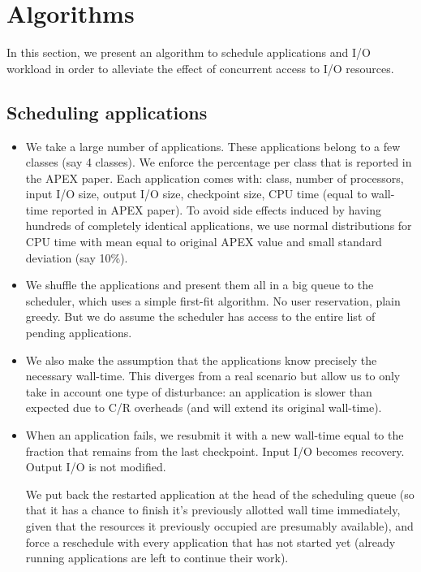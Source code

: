 \section{Algorithms}\label{sec:algorithms}

In this section, we present an algorithm to schedule applications and
I/O workload in order to alleviate the effect of concurrent access
to I/O resources.

\subsection{Scheduling applications}

\begin{itemize}
\item We take a large number of applications. These applications belong to a few
  classes (say 4 classes). We enforce the percentage per class that is reported in
  the APEX paper.  Each application comes with: class, number of processors, input
  I/O size, output I/O size, checkpoint size, CPU time (equal to wall-time reported
  in APEX paper). To avoid side effects induced by having hundreds of completely
  identical applications, we use normal distributions for CPU time with mean equal to
  original APEX value and small standard deviation (say 10\%). 
  \item We shuffle the applications and present them all in a big queue to the scheduler,
  which uses a simple first-fit algorithm. No user reservation, plain greedy. But we do assume the scheduler has access to the entire list of pending applications.
\item We also make the assumption that the applications know precisely
  the necessary wall-time. This diverges from a real scenario but
  allow us to only take in account one type of disturbance: an
  application is slower than expected due to C/R overheads (and will
  extend its original wall-time). 
  \item When an application fails, we resubmit it with a new wall-time equal to the fraction that remains from the last checkpoint.  Input I/O becomes recovery. Output I/O is not modified.

We put back the restarted application at the head of the scheduling queue
  (so that it has a chance to finish it's previously allotted wall time
  immediately, given that the resources it previously occupied are
  presumably available), and force a reschedule with every application that
  has not started yet (already running applications are left to continue
  their work).
\end{itemize}

